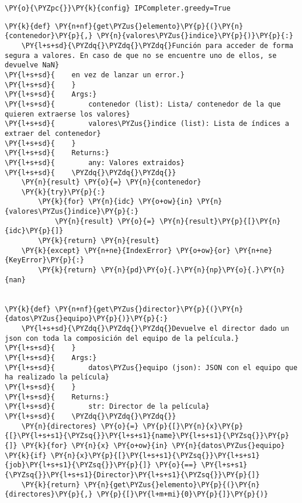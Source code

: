     \begin{tcolorbox}[breakable, size=fbox, boxrule=1pt, pad at break*=1mm,colback=cellbackground, colframe=cellborder]
\begin{Verbatim}[commandchars=\\\{\}]
\PY{o}{\PYZpc{}}\PY{k}{config} IPCompleter.greedy=True
\end{Verbatim}
\end{tcolorbox}

    \begin{tcolorbox}[breakable, size=fbox, boxrule=1pt, pad at break*=1mm,colback=cellbackground, colframe=cellborder]
\begin{Verbatim}[commandchars=\\\{\}]
\PY{k}{def} \PY{n+nf}{get\PYZus{}elemento}\PY{p}{(}\PY{n}{contenedor}\PY{p}{,} \PY{n}{valores\PYZus{}indice}\PY{p}{)}\PY{p}{:}
    \PY{l+s+sd}{\PYZdq{}\PYZdq{}\PYZdq{}Función para acceder de forma segura a valores. En caso de que no se encuentre uno de ellos, se devuelve NaN}
\PY{l+s+sd}{    en vez de lanzar un error.}
\PY{l+s+sd}{    }
\PY{l+s+sd}{    Args:}
\PY{l+s+sd}{        contenedor (list): Lista/ contenedor de la que quieren extraerse los valores}
\PY{l+s+sd}{        valores\PYZus{}indice (list): Lista de índices a extraer del contenedor}
\PY{l+s+sd}{    }
\PY{l+s+sd}{    Returns:}
\PY{l+s+sd}{        any: Valores extraidos}
\PY{l+s+sd}{    \PYZdq{}\PYZdq{}\PYZdq{}}
    \PY{n}{result} \PY{o}{=} \PY{n}{contenedor}
    \PY{k}{try}\PY{p}{:}
        \PY{k}{for} \PY{n}{idc} \PY{o+ow}{in} \PY{n}{valores\PYZus{}indice}\PY{p}{:}
            \PY{n}{result} \PY{o}{=} \PY{n}{result}\PY{p}{[}\PY{n}{idc}\PY{p}{]}
        \PY{k}{return} \PY{n}{result}
    \PY{k}{except} \PY{n+ne}{IndexError} \PY{o+ow}{or} \PY{n+ne}{KeyError}\PY{p}{:}
        \PY{k}{return} \PY{n}{pd}\PY{o}{.}\PY{n}{np}\PY{o}{.}\PY{n}{nan}


\PY{k}{def} \PY{n+nf}{get\PYZus{}director}\PY{p}{(}\PY{n}{datos\PYZus{}equipo}\PY{p}{)}\PY{p}{:}
    \PY{l+s+sd}{\PYZdq{}\PYZdq{}\PYZdq{}Devuelve el director dado un json con toda la composición del equipo de la película.}
\PY{l+s+sd}{    }
\PY{l+s+sd}{    Args:}
\PY{l+s+sd}{        datos\PYZus{}equipo (json): JSON con el equipo que ha realizado la película}
\PY{l+s+sd}{    }
\PY{l+s+sd}{    Returns:}
\PY{l+s+sd}{        str: Director de la película}
\PY{l+s+sd}{    \PYZdq{}\PYZdq{}\PYZdq{}}
    \PY{n}{directores} \PY{o}{=} \PY{p}{[}\PY{n}{x}\PY{p}{[}\PY{l+s+s1}{\PYZsq{}}\PY{l+s+s1}{name}\PY{l+s+s1}{\PYZsq{}}\PY{p}{]} \PY{k}{for} \PY{n}{x} \PY{o+ow}{in} \PY{n}{datos\PYZus{}equipo} \PY{k}{if} \PY{n}{x}\PY{p}{[}\PY{l+s+s1}{\PYZsq{}}\PY{l+s+s1}{job}\PY{l+s+s1}{\PYZsq{}}\PY{p}{]} \PY{o}{==} \PY{l+s+s1}{\PYZsq{}}\PY{l+s+s1}{Director}\PY{l+s+s1}{\PYZsq{}}\PY{p}{]}
    \PY{k}{return} \PY{n}{get\PYZus{}elemento}\PY{p}{(}\PY{n}{directores}\PY{p}{,} \PY{p}{[}\PY{l+m+mi}{0}\PY{p}{]}\PY{p}{)}



\end{Verbatim}
\end{tcolorbox}
